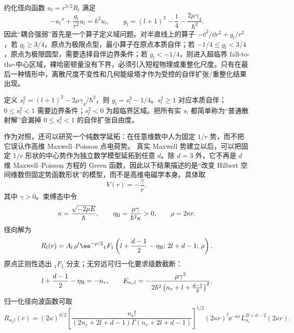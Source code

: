 约化径向函数 $u_l=r^{3/2}R_l$ 满足
\begin{equation}\label{eq:phys-hdqm-inverse-square-reduced}
 -u_l''+\frac{g_l}{r^2}u_l=k^2u_l,
 \qquad
 g_l=\left(l+1\right)^2-\frac14-\frac{2\mu\gamma_4}{\hbar^2}.
\end{equation}
因此“耦合强弱”首先是一个算子定义域问题。对半直线上的算子 $-\dd^2/\dd r^2+g_l/r^2$，若 $g_l\ge3/4$，原点为极限点型，最小算子在原点本质自伴；若 $-1/4\le g_l<3/4$，原点为极限圆型，需要选择自伴边界条件；若 $g_l<-1/4$，则进入超临界 fall-to-the-中心区域，裸哈密顿量没有下界，必须引入短程物理或重整化尺度。只有在最后一种情形中，离散尺度不变性和几何能级塔才作为受控的自伴扩张/重整化结果出现。
\begin{note}[四维逆平方势的临界参数]
定义 $s_l^2=(l+1)^2-2\mu\gamma_4/\hbar^2$，则 $g_l=s_l^2-1/4$。$s_l^2\ge1$ 对应本质自伴；$0\le s_l^2<1$ 需要边界条件；$s_l^2<0$ 为超临界区域。把所有实 $s_l$ 都简单称为“普通散射解”会漏掉 $0\le s_l^2<1$ 的自伴扩张自由度。
\end{note}
作为对照，还可以研究一个纯数学延拓：在任意维数中人为固定 $1/r$ 势，而不把它误认作高维 Maxwell--Poisson 点电荷势。
真实 Maxwell 势建立以后，可以把固定 $1/r$ 形状的中心势作为独立数学模型延拓到任意 $d$。除 $d=3$ 外，它不再是 $d$ 维 Maxwell--Poisson 方程的 Green 函数，因此以下结果描述的是“改变 Hilbert 空间维数但固定势函数形状”的模型，而不是高维电磁学本身。具体取
\begin{equation}
	V(r)=-\frac{\gamma}{r},
	\label{eq:phys-hdqm-formal-coulomb}
\end{equation}
其中 \(\gamma>0\)。束缚态中令
\begin{equation}
	\kappa=\frac{\sqrt{-2\mu E}}{\hbar},\qquad
	\eta_{\rm B}=\frac{\mu\gamma}{\hbar^2\kappa}>0,\qquad
	\rho=2\kappa r.
\end{equation}
径向解为
\begin{equation}
	R_l(r)=A_l\,\rho^l\ee^{-\rho/2}
	{}_1F_1\left(l+\frac{d-1}{2}-\eta_{\rm B};\,2l+d-1;\,\rho\right).
\end{equation}
原点正则性选出 \({}_1F_1\) 分支；无穷远可归一化要求级数截断：
\begin{equation}
	l+\frac{d-1}{2}-\eta_{\rm B}=-n_r,\qquad
	E_{n_rl}=-\frac{\mu\gamma^2}{2\hbar^2
	\left(n_r+l+\frac{d-1}{2}\right)^2}.
	\label{eq:phys-hdqm-formal-coulomb-energy}
\end{equation}
归一化径向波函数可取
\begin{equation}
	R_{n_rl}(r)=
	(2\kappa)^{d/2}
	\left[
	\frac{n_r!}{(2n_r+2l+d-1)\Gamma(n_r+2l+d-1)}
	\right]^{1/2}
	(2\kappa r)^l\ee^{-\kappa r}
	L_{n_r}^{2l+d-2}(2\kappa r).
	\label{eq:phys-hdqm-formal-coulomb-bound}
\end{equation}
